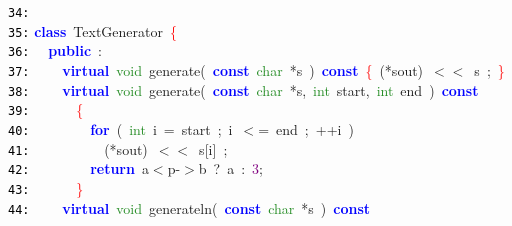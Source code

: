 \documentclass{article}
\begin{document}
\mbox{}\texttt{\textcolor{Black}{34:}}  \\
\mbox{}\texttt{\textcolor{Black}{35:}} \textbf{\textcolor{Blue}{class}}\ \label{test.h:35}TextGenerator\ \textcolor{Red}{\{} \\
\mbox{}\texttt{\textcolor{Black}{36:}} \ \ \textbf{\textcolor{Blue}{public}}\ \textcolor{BrickRed}{:} \\
\mbox{}\texttt{\textcolor{Black}{37:}} \ \ \ \ \textbf{\textcolor{Blue}{virtual}}\ \textcolor{ForestGreen}{void}\ \label{test.h:37}generate\textcolor{BrickRed}{(}\ \textbf{\textcolor{Blue}{const}}\ \textcolor{ForestGreen}{char}\ \textcolor{BrickRed}{*}s\ \textcolor{BrickRed}{)}\ \textbf{\textcolor{Blue}{const}}\ \textcolor{Red}{\{}\ \textcolor{BrickRed}{(*}sout\textcolor{BrickRed}{)}\ \textcolor{BrickRed}{$<$$<$}\ s\ \textcolor{BrickRed}{;}\ \textcolor{Red}{\}} \\
\mbox{}\texttt{\textcolor{Black}{38:}} \ \ \ \ \textbf{\textcolor{Blue}{virtual}}\ \textcolor{ForestGreen}{void}\ \label{test.h:38}generate\textcolor{BrickRed}{(}\ \textbf{\textcolor{Blue}{const}}\ \textcolor{ForestGreen}{char}\ \textcolor{BrickRed}{*}s\textcolor{BrickRed}{,}\ \textcolor{ForestGreen}{int}\ start\textcolor{BrickRed}{,}\ \textcolor{ForestGreen}{int}\ end\ \textcolor{BrickRed}{)}\ \textbf{\textcolor{Blue}{const}}\  \\
\mbox{}\texttt{\textcolor{Black}{39:}} \ \ \ \ \ \ \textcolor{Red}{\{} \\
\mbox{}\texttt{\textcolor{Black}{40:}} \ \ \ \ \ \ \ \ \textbf{\textcolor{Blue}{for}}\ \textcolor{BrickRed}{(}\ \textcolor{ForestGreen}{int}\ i\ \textcolor{BrickRed}{=}\ start\ \textcolor{BrickRed}{;}\ i\ \textcolor{BrickRed}{$<$=}\ end\ \textcolor{BrickRed}{;}\ \textcolor{BrickRed}{++}i\ \textcolor{BrickRed}{)} \\
\mbox{}\texttt{\textcolor{Black}{41:}} \ \ \ \ \ \ \ \ \ \ \textcolor{BrickRed}{(*}sout\textcolor{BrickRed}{)}\ \textcolor{BrickRed}{$<$$<$}\ s\textcolor{BrickRed}{[}i\textcolor{BrickRed}{]}\ \textcolor{BrickRed}{;} \\
\mbox{}\texttt{\textcolor{Black}{42:}} \ \ \ \ \ \ \ \ \textbf{\textcolor{Blue}{return}}\ a\textcolor{BrickRed}{$<$}p\textcolor{BrickRed}{-$>$}b\ \textcolor{BrickRed}{?}\ a\ \textcolor{BrickRed}{:}\ \textcolor{Purple}{3}\textcolor{BrickRed}{;} \\
\mbox{}\texttt{\textcolor{Black}{43:}} \ \ \ \ \ \ \textcolor{Red}{\}} \\
\mbox{}\texttt{\textcolor{Black}{44:}} \ \ \ \ \textbf{\textcolor{Blue}{virtual}}\ \textcolor{ForestGreen}{void}\ \label{test.h:44}generateln\textcolor{BrickRed}{(}\ \textbf{\textcolor{Blue}{const}}\ \textcolor{ForestGreen}{char}\ \textcolor{BrickRed}{*}s\ \textcolor{BrickRed}{)}\ \textbf{\textcolor{Blue}{const}} \\
\end{document}
